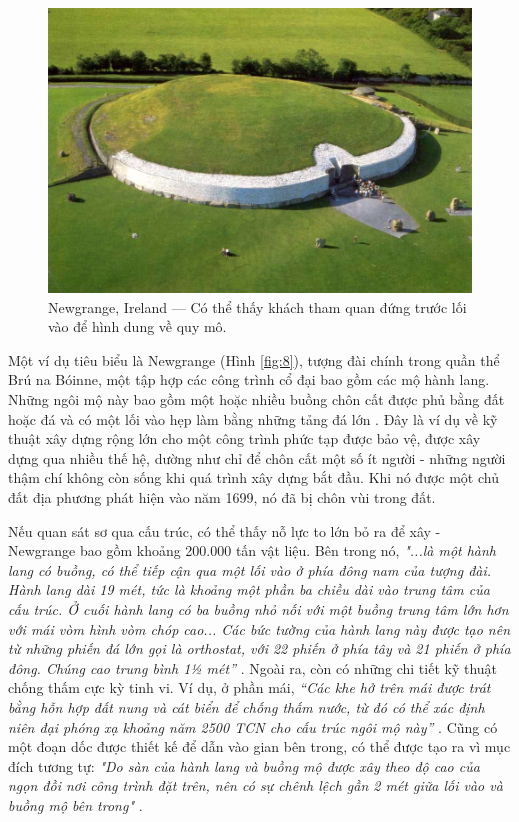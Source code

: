 \documentclass[10pt,twocolumn,letterpaper]{article}
\begin{document}
\begin{figure}[b]
\begin{center}
   \includegraphics[width=1\linewidth]{ww19.jpg}
\end{center}
   \caption{Newgrange, Ireland — Có thể thấy khách tham quan đứng trước lối vào để hình dung về quy mô.}
\label{fig:8}
\label{fig:onecol}
\end{figure}

Một ví dụ tiêu biểu là Newgrange (Hình \ref{fig:8}), tượng đài chính trong quần thể Brú na Bóinne, một tập hợp các công trình cổ đại bao gồm các mộ hành lang. Những ngôi mộ này bao gồm một hoặc nhiều buồng chôn cất được phủ bằng đất hoặc đá và có một lối vào hẹp làm bằng những tảng đá lớn \cite{70}. Đây là ví dụ về kỹ thuật xây dựng rộng lớn cho một công trình phức tạp được bảo vệ, được xây dựng qua nhiều thế hệ, dường như chỉ để chôn cất một số ít người - những người thậm chí không còn sống khi quá trình xây dựng bắt đầu. Khi nó được một chủ đất địa phương phát hiện vào năm 1699, nó đã bị chôn vùi trong đất.

Nếu quan sát sơ qua cấu trúc, có thể thấy nỗ lực to lớn bỏ ra để xây - Newgrange bao gồm khoảng 200.000 tấn vật liệu. Bên trong nó, \textit{"...là một hành lang có buồng, có thể tiếp cận qua một lối vào ở phía đông nam của tượng đài. Hành lang dài 19 mét, tức là khoảng một phần ba chiều dài vào trung tâm của cấu trúc. Ở cuối hành lang có ba buồng nhỏ nối với một buồng trung tâm lớn hơn với mái vòm hình vòm chóp cao... Các bức tường của hành lang này được tạo nên từ những phiến đá lớn gọi là orthostat, với 22 phiến ở phía tây và 21 phiến ở phía đông. Chúng cao trung bình 1½ mét”} \cite{70}. Ngoài ra, còn có những chi tiết kỹ thuật chống thấm cực kỳ tinh vi. Ví dụ, ở phần mái, \textit{“Các khe hở trên mái được trát bằng hỗn hợp đất nung và cát biển để chống thấm nước, từ đó có thể xác định niên đại phóng xạ khoảng năm 2500 TCN cho cấu trúc ngôi mộ này”} \cite{71}. Cũng có một đoạn dốc được thiết kế để dẫn vào gian bên trong, có thể được tạo ra vì mục đích tương tự: \textit{"Do sàn của hành lang và buồng mộ được xây theo độ cao của ngọn đồi nơi công trình đặt trên, nên có sự chênh lệch gần 2 mét giữa lối vào và buồng mộ bên trong"} \cite{71}.
\end{document}
